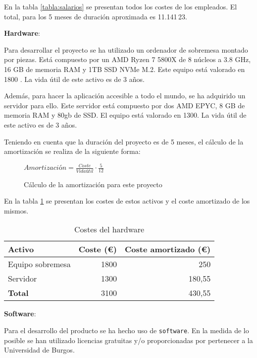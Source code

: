 En la tabla \ref{tabla:salarios} se presentan todos los costes de los empleados.
El total, para los 5 meses de duración aproximada es 11.141\,23\texteuro.

\textbf{Hardware}:

Para desarrollar el proyecto se ha utilizado un ordenador de sobremesa montado
por piezas. Está compuesto por un AMD Ryzen 7 5800X de 8 núcleos a 3.8 GHz, 16
GB de memoria RAM y 1TB SSD NVMe M.2. Este equipo está valorado en 1800
\texteuro. La vida útil de este activo es de 3 años.

Además, para hacer la aplicación accesible a todo el mundo, se ha adquirido un
servidor para ello. Este servidor está compuesto por dos AMD EPYC, 8 GB de
memoria RAM y 80gb de SSD. El equipo está valorado en 1300\texteuro. La vida
útil de este activo es de 3 años.

Teniendo en cuenta que la duración del proyecto es de 5 meses, el cálculo de la
amortización se realiza de la siguiente forma:

\begin{figure}[H]
\begin{center}
$Amortización = \frac{Coste}{Vida útil} \cdot \frac{5}{12}$
\end{center}
\caption{Cálculo de la amortización para este proyecto}
\end{figure}


En la tabla \ref{tabla:hardware} se presentan los costes de estos activos y el
coste amortizado de los mismos.

\begin{table}[H]
    \centering
\begin{tabular}{lrr}
\toprule
\textbf{Activo}      & \textbf{Coste (€)}      & \textbf{Coste amortizado (€)}      \\ \midrule
Equipo sobremesa     & 1800                    & 250                      \\
Servidor             & 1300                    & 180,55                      \\ \midrule
\textbf{Total}       & 3100                    & 430,55                      \\ \midrule
\end{tabular}
\caption{Costes del hardware}
\label{tabla:hardware}
\end{table}


\textbf{Software}:

Para el desarrollo del producto se ha hecho uso de \texttt{software}. En la
medida de lo posible se han utilizado licencias gratuitas y/o proporcionadas por
pertenecer a la Universidad de Burgos.

